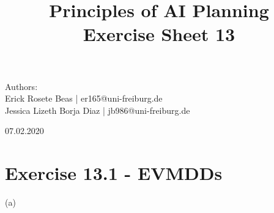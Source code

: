 \documentclass[11pt,a4paper]{article}
\title{\textbf{Principles of AI Planning
		\\{\Large Exercise Sheet 13}}}
\begin{document}
\begin{flushleft}
	Authors:\\
	Erick Rosete Beas | er165@uni-freiburg.de\\
	Jessica Lizeth Borja Diaz | jb986@uni-freiburg.de\\
\end{flushleft}
{\let\newpage\relax\maketitle}
\begin{center} 
	\large 07.02.2020
\end{center}


\section*{Exercise 13.1 - EVMDDs}
(a)
\end{document}
